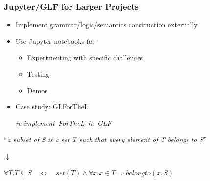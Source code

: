 \documentclass{beamer}
\def\str#1{{\color{black!60!green}``\textit{#1}''}}
\newcommand{\com}[1]{\strut\hfil\strut\null\nobreak\hfill\hbox{{\itshape \color{black!50}#1}}\par}
\begin{document}
\begin{frame}
    \frametitle{Jupyter/GLF for Larger Projects}
    \begin{itemize}
        \item Implement grammar/logic/semantics construction externally
        \item Use Jupyter notebooks for
            \begin{itemize}
                \item Experimenting with specific challenges
                \item Testing
                \item Demos
            \end{itemize}
        \item Case study: GLForTheL \com{re-implement ForTheL in GLF}
    \end{itemize}

    \vspace{2em}
    \centering
    \str{a subset of S is a set T such that every element of T belongs to S}
    
    \vspace{0.2em}
    $\downarrow$

    \vspace{0.2em}
    $\forall T. T \subseteq S \quad \Leftrightarrow\quad set(T) \wedge \forall x.x\in T \Rightarrow belongto(x,S)$
\end{frame}
\end{document}
